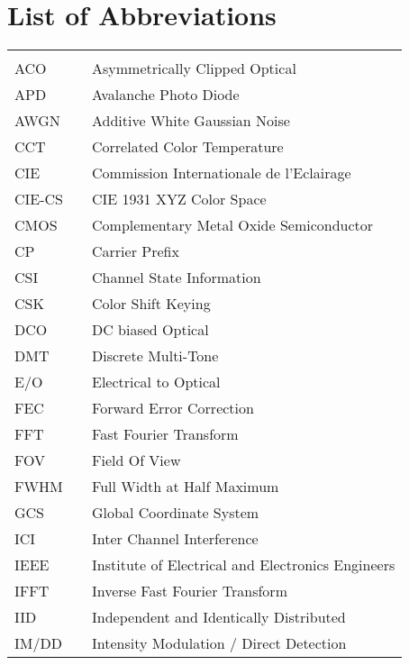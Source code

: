\chapter*{List of Abbreviations}
\begin{center}
  \begin{longtable}{lll}
    \hspace*{2em} & \hspace*{1in} & \hspace*{4.5in} \\
    ACO & \dotfill & Asymmetrically Clipped Optical \\
		APD & \dotfill & Avalanche Photo Diode \\
		AWGN & \dotfill & Additive White Gaussian Noise \\
		CCT & \dotfill & Correlated Color Temperature \\
		CIE & \dotfill & Commission Internationale de l'Eclairage \\
		CIE-CS  & \dotfill & CIE 1931 XYZ Color Space \\
		CMOS & \dotfill & Complementary Metal Oxide Semiconductor \\
		CP & \dotfill & Carrier Prefix \\
		CSI & \dotfill & Channel State Information \\
		CSK & \dotfill & Color Shift Keying \\
		DCO & \dotfill & DC biased Optical \\
		DMT & \dotfill & Discrete Multi-Tone \\
		E/O & \dotfill & Electrical to Optical \\
		FEC & \dotfill & Forward Error Correction \\
		FFT & \dotfill & Fast Fourier Transform \\
		FOV & \dotfill & Field Of View \\
		FWHM & \dotfill & Full Width at Half Maximum \\
		GCS & \dotfill & Global Coordinate System \\
		ICI & \dotfill & Inter Channel Interference \\
		IEEE & \dotfill & Institute of Electrical and Electronics Engineers \\
		IFFT & \dotfill & Inverse Fast Fourier Transform \\
		IID & \dotfill & Independent and Identically Distributed \\
		IM/DD & \dotfill & Intensity Modulation / Direct Detection \\

\end{longtable}
\end{center}

